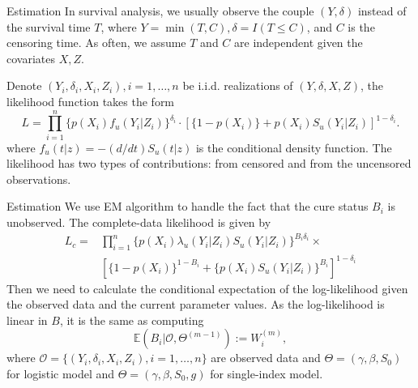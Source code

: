 \documentclass[10 pt]{beamer}
\newcommand{\Ex}  {\mathbb{E}}
\begin{document}
\begin{frame}{Estimation}
		In survival analysis, we usually observe the couple $(Y,\delta)$ instead of the survival time $T$, where $Y=\min (T,C), \delta = I(T\leqslant C)$, and $C$ is the censoring time. As often, we assume $T$ and $C$ are independent given the covariates $X,Z$. 
		
		Denote $(Y_i,\delta_i,X_i,Z_i),i=1,\ldots,n$ be i.i.d. realizations of $(Y,\delta,X,Z)$, the likelihood function takes the form
		\begin{equation}\label{equ:L_c}
			L = \prod_{i=1}^{n}\{p(X_i)f_u(Y_i|Z_i)\}^{\delta_i}\cdot \left[\{1-p(X_i)\}+p(X_i)S_u(Y_i|Z_i)\right]^{1-\delta_i}.
		\end{equation}
		where $f_u(t|z) = -(d/dt)S_u(t|z)$ is the conditional density function. The likelihood has two types of contributions: from censored and from the uncensored observations. 
\end{frame}

\begin{frame}{Estimation}
	We use EM algorithm to handle the fact that the cure status $B_i$ is unobserved. The complete-data likelihood is given by
	\begin{equation}\label{equ:com_data}
	\begin{aligned}
		L_c =& \prod_{i=1}^{n}\{p(X_i)\lambda_u(Y_i|Z_i)S_u(Y_i|Z_i)\}^{B_i \delta_i}\times \\ &\left[\{1-p(X_i)\}^{1-B_i}+\{p(X_i)S_u(Y_i|Z_i)\}^{B_i} \right]^{1-\delta_i}
	\end{aligned}
	\end{equation}
	Then we need to calculate the conditional expectation of the log-likelihood given the observed data and the current parameter values. As the log-likelihood is linear in $B$, it is the same as computing $$\Ex(B_i|\mathcal{O},\Theta^{(m-1)}) := W_i^{(m)},$$
	where $\mathcal{O} = \{(Y_i,\delta_i,X_i,Z_i),i=1,\ldots,n\}$ are observed data and $ \Theta = (\gamma,\beta,S_0)$ for logistic model and $\Theta = (\gamma,\beta,S_0,g)$ for single-index model.
\end{frame}
\end{document}
